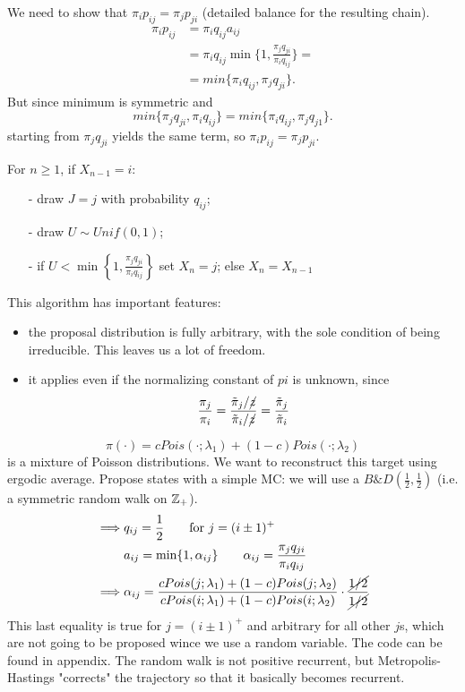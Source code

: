 \documentclass{article}
\begin{document}
\begin{proof2}
    We need to show that $\pi_ip_{ij}=\pi_jp_{ji}$ (detailed balance for the resulting chain).
        \begin{align*}
            \pi_ip_{ij}&=\pi_iq_{ij}a_{ij}\\
            &=\pi_iq_{ij}\min\bigg\{1,\frac{\pi_jq_{ji}}{\pi_iq_{ij}}\bigg\}=\\
            &=min\bigg\{\pi_iq_{ij},\pi_jq_{ji}\bigg\}.
        \end{align*}
        But since minimum is symmetric and \[
        min\big\{\pi_jq_{ji},\pi_iq_{ij}\big\}=min\big\{\pi_iq_{ij},\pi_jq_{j1}\big\}.
        \]
        starting from $\pi_jq_{ji}$ yields the same term, so $\pi_i p_{ij}=\pi_jp_{ji}$.
\end{proof2}
\begin{algorithm}
     For $n\geqslant1$, if $X_{n-1}=i$:
    \begin{itemize}
        \item [-] draw $J=j$ with probability $q_{ij}$;
        \item [-] draw $U\sim Unif(0,1)$;
        \item [-] if $U<\min\left\{1,\frac{\pi_jq_{ji}}{\pi_iq_{ij}}\right\}$ set $X_n=j$; else $X_n=X_{n-1}$
    \end{itemize}
\end{algorithm}
This algorithm has important features:
\begin{itemize}
    \item the proposal distribution is fully arbitrary, with the sole condition of being irreducible. This leaves us a lot of freedom.
    \item it applies even if the normalizing constant of $pi$ is unknown, since
    \[
    \frac{\pi_j}{\pi_i}=\frac{\tilde{\pi}_j/\cancel{z}}{\tilde{\pi}_i/\cancel{z}}=\frac{\tilde{\pi}_j}{\tilde{\pi}_i}
    \]
\end{itemize}
\begin{example}
    \[
\pi(\cdot)=cPois(\cdot;\lambda_1)+(1-c)Pois(\cdot;\lambda_2)
\]
is a mixture of Poisson distributions. We want to reconstruct this target using ergodic average. Propose states with a simple MC: we will use a $B\&D\left(\frac{1}{2},\frac{1}{2}\right)$ (i.e. a symmetric random walk on $\mathbb{Z}_+$).
\begin{align*}
    \implies &q_{ij}=\frac{1}{2}\qquad\text{for }j=(i\pm1)^+\\
    & a_{ij}=\min\{1,\alpha_{ij}\}\qquad\alpha_{ij}=\frac{\pi_jq_{ji}}{\pi_iq_{ij}}\\
    \implies &\alpha_{ij}=\frac{cPois(j;\lambda_1)+(1-c)Pois(j;\lambda_2)}{cPois(i;\lambda_1)+(1-c)Pois(i;\lambda_2)}\cdot\frac{\cancel{1/2}}{\cancel{1/2}}
\end{align*} This last equality is true for $j=(i\pm1)^+$ and arbitrary for all other $j$s, which are not going to be proposed wince we use a random variable. The code can be found in appendix. %
The random walk is not positive recurrent, but Metropolis-Hastings "corrects" the trajectory so that it basically becomes recurrent.
\end{example}
\end{document}
